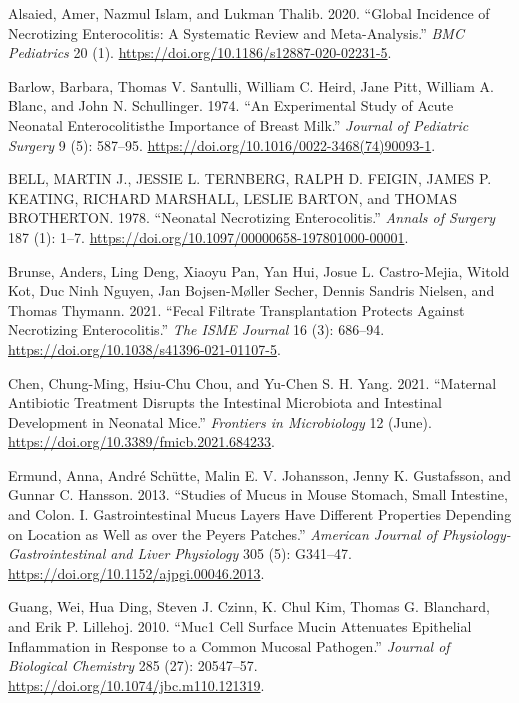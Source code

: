 \documentclass[
]{article}
\newlength{\cslhangindent}
\newlength{\cslentryspacingunit} %
\newenvironment{CSLReferences}[2] %
 {%
  \setlength{\parindent}{0pt}
  \ifodd #1
  \let\oldpar\par
  \def\par{\hangindent=\cslhangindent\oldpar}
  \fi
  \setlength{\parskip}{#2\cslentryspacingunit}
 }%
 {}
\begin{document}
\hypertarget{refs}{}
\begin{CSLReferences}{1}{0}
\leavevmode{}%
Alsaied, Amer, Nazmul Islam, and Lukman Thalib. 2020. {``Global Incidence of Necrotizing Enterocolitis: A Systematic Review and Meta-Analysis.''} \emph{{BMC} Pediatrics} 20 (1). \url{https://doi.org/10.1186/s12887-020-02231-5}.

\leavevmode{}%
Barlow, Barbara, Thomas V. Santulli, William C. Heird, Jane Pitt, William A. Blanc, and John N. Schullinger. 1974. {``An Experimental Study of Acute Neonatal Enterocolitis{\textemdash}the Importance of Breast Milk.''} \emph{Journal of Pediatric Surgery} 9 (5): 587--95. \url{https://doi.org/10.1016/0022-3468(74)90093-1}.

\leavevmode{}%
BELL, MARTIN J., JESSIE L. TERNBERG, RALPH D. FEIGIN, JAMES P. KEATING, RICHARD MARSHALL, LESLIE BARTON, and THOMAS BROTHERTON. 1978. {``Neonatal Necrotizing Enterocolitis.''} \emph{Annals of Surgery} 187 (1): 1--7. \url{https://doi.org/10.1097/00000658-197801000-00001}.

\leavevmode{}%
Brunse, Anders, Ling Deng, Xiaoyu Pan, Yan Hui, Josue L. Castro-Mejia, Witold Kot, Duc Ninh Nguyen, Jan Bojsen-Møller Secher, Dennis Sandris Nielsen, and Thomas Thymann. 2021. {``Fecal Filtrate Transplantation Protects Against Necrotizing Enterocolitis.''} \emph{The {ISME} Journal} 16 (3): 686--94. \url{https://doi.org/10.1038/s41396-021-01107-5}.

\leavevmode{}%
Chen, Chung-Ming, Hsiu-Chu Chou, and Yu-Chen S. H. Yang. 2021. {``Maternal Antibiotic Treatment Disrupts the Intestinal Microbiota and Intestinal Development in Neonatal Mice.''} \emph{Frontiers in Microbiology} 12 (June). \url{https://doi.org/10.3389/fmicb.2021.684233}.

\leavevmode{}%
Ermund, Anna, André Schütte, Malin E. V. Johansson, Jenny K. Gustafsson, and Gunnar C. Hansson. 2013. {``Studies of Mucus in Mouse Stomach, Small Intestine, and Colon. I. Gastrointestinal Mucus Layers Have Different Properties Depending on Location as Well as over the Peyer{\textquotesingle}s Patches.''} \emph{American Journal of Physiology-Gastrointestinal and Liver Physiology} 305 (5): G341--47. \url{https://doi.org/10.1152/ajpgi.00046.2013}.

\leavevmode{}%
Guang, Wei, Hua Ding, Steven J. Czinn, K. Chul Kim, Thomas G. Blanchard, and Erik P. Lillehoj. 2010. {``Muc1 Cell Surface Mucin Attenuates Epithelial Inflammation in Response to a Common Mucosal Pathogen.''} \emph{Journal of Biological Chemistry} 285 (27): 20547--57. \url{https://doi.org/10.1074/jbc.m110.121319}.


\end{CSLReferences}
\end{document}
